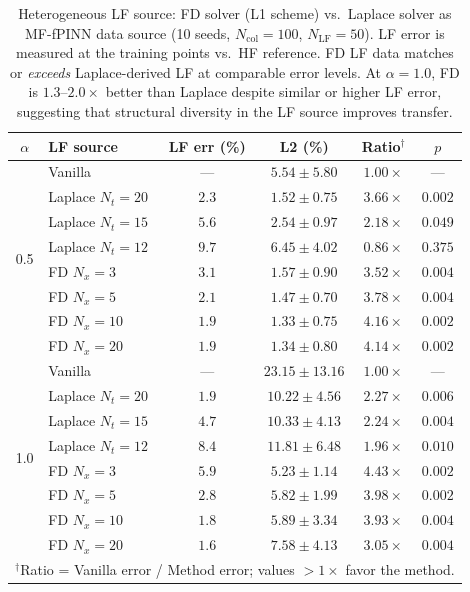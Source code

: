 \documentclass[11pt]{article}
\newcommand{\Ncol}{N_{\mathrm{col}}}
\newcommand{\NLF}{N_{\mathrm{LF}}}
\begin{document}
\begin{table}[t]
\centering
\caption{Heterogeneous LF source: FD solver (L1 scheme) vs.\ Laplace solver as MF-fPINN data source (10 seeds, $\Ncol = 100$, $\NLF = 50$). LF error is measured at the training points vs.\ HF reference. FD LF data matches or \emph{exceeds} Laplace-derived LF at comparable error levels. At $\alpha = 1.0$, FD is $1.3$--$2.0\times$ better than Laplace despite similar or higher LF error, suggesting that structural diversity in the LF source improves transfer.}
\label{tab:heterogeneous}
\begin{tabular}{clcccc}
\toprule
$\alpha$ & LF source & LF err (\%) & L2 (\%) & Ratio$^\dagger$ & $p$ \\
\midrule
\multirow{8}{*}{0.5}
& Vanilla          & ---  & $5.54 \pm 5.80$  & $1.00\times$ & --- \\
& Laplace $N_t{=}20$ & $2.3$ & $1.52 \pm 0.75$  & $3.66\times$ & $0.002$ \\
& Laplace $N_t{=}15$ & $5.6$ & $2.54 \pm 0.97$  & $2.18\times$ & $0.049$ \\
& Laplace $N_t{=}12$ & $9.7$ & $6.45 \pm 4.02$  & $0.86\times$ & $0.375$ \\
\cmidrule{2-6}
& FD $N_x{=}3$  & $3.1$ & $1.57 \pm 0.90$  & $3.52\times$ & $0.004$ \\
& FD $N_x{=}5$  & $2.1$ & $1.47 \pm 0.70$  & $3.78\times$ & $0.004$ \\
& FD $N_x{=}10$ & $1.9$ & $\mathbf{1.33 \pm 0.75}$  & $\mathbf{4.16\times}$ & $0.002$ \\
& FD $N_x{=}20$ & $1.9$ & $1.34 \pm 0.80$  & $4.14\times$ & $0.002$ \\
\midrule
\multirow{8}{*}{1.0}
& Vanilla          & ---  & $23.15 \pm 13.16$ & $1.00\times$ & --- \\
& Laplace $N_t{=}20$ & $1.9$ & $10.22 \pm 4.56$  & $2.27\times$ & $0.006$ \\
& Laplace $N_t{=}15$ & $4.7$ & $10.33 \pm 4.13$  & $2.24\times$ & $0.004$ \\
& Laplace $N_t{=}12$ & $8.4$ & $11.81 \pm 6.48$  & $1.96\times$ & $0.010$ \\
\cmidrule{2-6}
& FD $N_x{=}3$  & $5.9$ & $\mathbf{5.23 \pm 1.14}$   & $\mathbf{4.43\times}$ & $0.002$ \\
& FD $N_x{=}5$  & $2.8$ & $5.82 \pm 1.99$   & $3.98\times$ & $0.002$ \\
& FD $N_x{=}10$ & $1.8$ & $5.89 \pm 3.34$   & $3.93\times$ & $0.004$ \\
& FD $N_x{=}20$ & $1.6$ & $7.58 \pm 4.13$   & $3.05\times$ & $0.004$ \\
\bottomrule
\multicolumn{6}{l}{\small $^\dagger$Ratio = Vanilla error / Method error; values $>1\times$ favor the method.} \\
\end{tabular}
\end{table}
\end{document}
